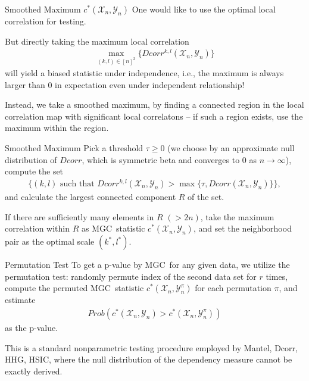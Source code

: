 \documentclass[mathserif,t]{beamer}
\newcommand{\Mgc}{MGC}
\begin{document}
\begin{frame}{Smoothed Maximum $c^{*}(\mathcal{X}_{n},\mathcal{Y}_{n})$}
One would like to use the optimal local correlation for testing.\\
\pause
\medskip

But directly taking the maximum local correlation 
\begin{align*}
\max_{(k,l) \in [n]^2}\{Dcorr^{k,l}(\mathcal{X}_{n},\mathcal{Y}_{n})\}
\end{align*}
will yield a biased statistic under independence, i.e., the maximum is always larger than $0$ in expectation even under independent relationship!

\pause
\medskip
Instead, we take a smoothed maximum, by finding a connected region in the local correlation map with significant local correlatons -- if such a region exists, use the maximum within the region.
\end{frame}

\begin{frame}{Smoothed Maximum}
Pick a threshold $\tau \geq 0$ (we choose by an approximate null distribution of $Dcorr$, which is symmetric beta and converges to $0$ as $n \rightarrow \infty$), compute the set
\begin{align*}
\{(k,l) \mbox{ such that } Dcorr^{k,l}(\mathcal{X}_{n},\mathcal{Y}_{n})>\max\{\tau, Dcorr(\mathcal{X}_{n},\mathcal{Y}_{n})\} \},
\end{align*}
\pause
and calculate the largest connected component $R$ of the set.

\pause
\medskip
If there are sufficiently many elements in $R$ $(>2n)$, take the maximum correlation within $R$ as \Mgc~statistic $c^{*}(\mathcal{X}_{n},\mathcal{Y}_{n})$, 
\pause
and set the neighborhood pair as the optimal scale $(k^*,l^*)$.
\end{frame}

\begin{frame}{Permutation Test}
To get a p-value by \Mgc~for any given data, we utilize the permutation test: randomly permute index of the second data set for $r$ times, compute the permuted \Mgc~statistic $c^{*}(\mathcal{X}_{n},\mathcal{Y}_{n}^{\pi})$ for each permutation $\pi$, and estimate 
\begin{align*}
Prob(c^{*}(\mathcal{X}_{n},\mathcal{Y}_{n})>c^{*}(\mathcal{X}_{n},\mathcal{Y}_{n}^{\pi}))
\end{align*}
as the p-value.
\pause
\medskip

This is a standard nonparametric testing procedure employed by Mantel, Dcorr, HHG, HSIC, where the null distribution of the dependency measure cannot be exactly derived.
\end{frame}
\end{document}
